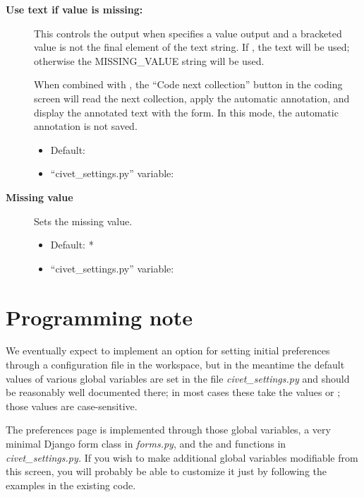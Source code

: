 \documentclass[letterpaper,10pt,english]{sphinxmanual}
\begin{document}
\begin{description}
\item[{\textbf{Use text if value is missing:}}] \leavevmode
This controls the output when  specifies a value output and a
bracketed value is not the final element of the text string.  If ,
the text will be
used; otherwise the MISSING\_VALUE string will be used.

When combined with , the
“Code next collection” button in the coding screen will read the next
collection, apply the automatic annotation, and display the annotated
text with the form. In this mode, the automatic annotation is not
saved.
\begin{itemize}
\item {} 
Default: 

\item {} 
“civet\_settings.py” variable: 

\end{itemize}

\item[{\textbf{Missing value}}] \leavevmode
Sets the missing value.
\begin{itemize}
\item {} 
Default: *

\item {} 
“civet\_settings.py” variable: 

\end{itemize}

\end{description}


\section{Programming note}
\label{preferences:programming-note}
We eventually expect to implement an option for setting initial preferences
through a configuration file in the workspace, but in the meantime the default
values of various global variables are set in the file
\emph{civet\_settings.py} and should be reasonably well documented there; in most
cases these take the values  or ; those values are
case-sensitive.

The preferences page is implemented through those global variables, a very
minimal Django form class  in \emph{forms.py}, and the 
and  functions in \emph{civet\_settings.py.}  If you wish
to make additional global variables modifiable from this screen,  you will probably be able to
customize it just by following the examples in the existing code.
\end{document}
